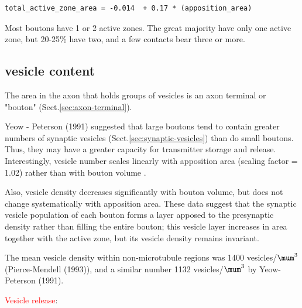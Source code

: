 \begin{verbatim}
total_active_zone_area = -0.014  + 0.17 * (apposition_area)
\end{verbatim}

Most boutons have 1 or 2 active zones. The great majority have only one active
zone, but 20-25\% have two, and a few contacts bear three or
more.


\subsection{vesicle content}
\label{sec:vesicle-content}

The area in the axon that holds groups of vesicles is
an axon terminal or "bouton" (Sect.\ref{sec:axon-terminal}). 

Yeow - Peterson (1991) suggested that large boutons tend to contain greater
numbers of synaptic vesicles (Sect.\ref{sec:synaptic-vesicles}) than do small
boutons. Thus, they may have a greater capacity for transmitter storage and
release. Interestingly, vesicle number scales linearly with apposition area
(scaling factor = 1.02) rather than with bouton volume \citep{yeow1991}.

Also, vesicle density decreases significantly with bouton volume, but does not
change systematically with apposition area. These data suggest that the synaptic
vesicle population of each bouton forms a layer apposed to the presynaptic
density rather than filling the entire bouton; this vesicle layer increases in
area together with the active zone, but its vesicle density remains invariant.

The mean vesicle density within non-microtubule regions was 1400
vesicles/$\mum^3$ (Pierce-Mendell (1993)), and a similar number 1132
vesicles/$\mum^3$ by Yeow-Peterson (1991).

\textcolor{red}{Vesicle release}: 

